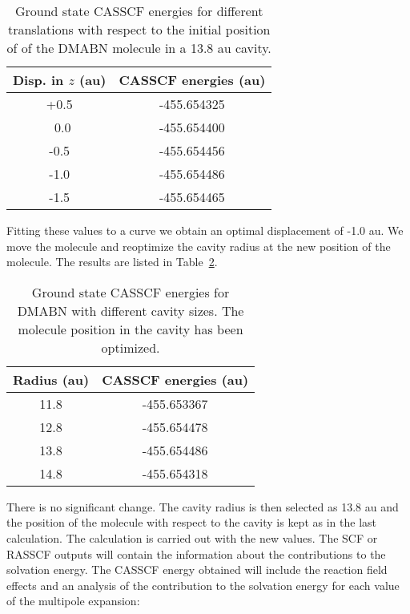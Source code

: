 \begin{table}[ht]
\begin{center}
\begin{tabular}{cc}
Disp. in $z$ (au) & CASSCF energies (au)\\
\hline
+0.5     & -455.654325 \\
~0.0     & -455.654400 \\
-0.5     & -455.654456 \\
-1.0     & -455.654486 \\
-1.5     & -455.654465 \\
\hline
\end{tabular}
\caption{\label{tab:cav2}Ground state CASSCF energies for different translations with respect to the initial position of of the DMABN molecule in a 13.8 au cavity.}
\end{center}
\end{table}

Fitting these values to a curve we obtain an optimal displacement of -1.0 au. We move the
molecule and reoptimize the cavity radius at the new position of the
molecule. The results are listed in Table~\ref{tab:cav3}.

\begin{table}[ht]
\begin{center}
\begin{tabular}{cc}
\\
Radius (au) & CASSCF energies (au)\\
\hline
11.8     & -455.653367 \\
12.8     & -455.654478 \\
13.8     & -455.654486 \\
14.8     & -455.654318 \\
\hline
\end{tabular}
\caption{\label{tab:cav3}Ground state CASSCF energies for DMABN with different cavity sizes. The molecule position in the cavity has been optimized.}
\end{center}
\end{table}

There is no significant change. The cavity radius is then selected as 13.8 au and the
position of the molecule with respect to the cavity is kept as in
the last calculation. The calculation is carried out with the new values.
The SCF or RASSCF outputs will contain the information about the 
contributions to the solvation energy. The CASSCF energy obtained will
include the reaction field effects and an analysis of the 
contribution to the solvation energy for each value of the multipole
expansion:

